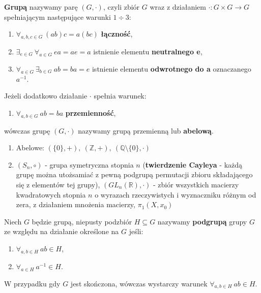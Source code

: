 \begin{df}
\textbf{Grupą} nazywamy parę $(G,\cdot)$, czyli zbiór $G$ wraz z działaniem $\cdot:G\times G\rightarrow G$ spełniającym następujące warunki $1\div 3$:
\begin{enumerate}[\rm(1)]
\item 
$\forall_{a,b,c\in G}\ (ab)c=a(bc)$ \textbf{łączność},
\item 
$\exists_{e\in G}\ \forall_{a\in G}\ ea=ae=a$ istnienie elementu \textbf{neutralnego e},
\item 
$\forall_{a\in G}\ \exists_{b\in G}\ ab=ba=e$ istnienie elementu \textbf{odwrotnego do a} oznaczanego $a^{-1}$.
\end{enumerate}
Jeżeli dodatkowo działanie $\cdot$ spełnia warunek:
\begin{enumerate}[\rm(4)]
\item 
$\forall_{a,b\in G}\ ab=ba$ \textbf{przemienność},
\end{enumerate}
wówczas grupę $(G,\cdot)$ nazywamy grupą przemienną lub \textbf{abelową}.
\end{df}

\begin{przyk}
\begin{enumerate}[\rm(1)]
\item 
Abelowe: $(\{0\},+),\ (\mathbb{Z},+),\ (\mathbb{Q}\setminus \{0\},\cdot)$
\item 
$(S_n,\circ)$ - grupa symetryczna stopnia $n$ (\textbf{twierdzenie Cayleya} - każdą grupę można utożsamiać z pewną podgrupą permutacji zbioru składającego się z elementów tej grupy), $(GL_n(\mathbb{R}),\cdot)$ - zbiór wszystkich macierzy kwadratowych stopnia $n$ o wyrazach rzeczywistych i wyznaczniku różnym od zera, z działaniem mnożenia macierzy, $\pi_1(X, x_0)$
\end{enumerate}
\end{przyk}

\begin{df}
Niech $G$ będzie grupą, niepusty podzbiór $H\subseteq G$ nazywamy \textbf{podgrupą} grupy $G$ ze względu na działanie określone na $G$ jeśli:
\begin{enumerate}[\rm(1)]
\item
$\forall_{a,b\in H}\ ab\in H$,
\item
$\forall_{a\in H}\ a^{-1}\in H$.
\end{enumerate}
\end{df}
W przypadku gdy $G$ jest skończona, wówczas wystarczy warunek $\forall_{a,b\in H}\ ab\in H$.

